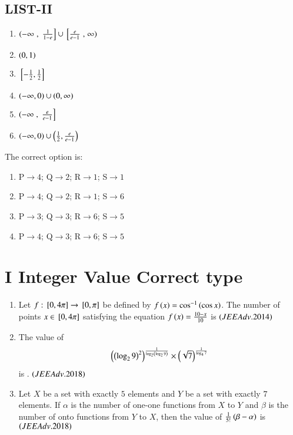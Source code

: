 \documentclass[journal,12pt,onecolumn,article]{IEEEtran}
\theoremstyle{remark}
\begin{document}
\begin{enumerate}
\begin{multicols}{2}
	\section*{LIST-II}
\begin{enumerate}
	\item $\left(-\infty\right.,{}\left.\frac{1}{1-e}\right]\cup{}\left[\frac{e}{e-1}\right.,\left.\infty\right)$
	\item $\left(0,1\right)$
	\item ${}\left[-\frac{1}{2},\frac{1}{2}\right]$
	\item $\left(-\infty,0\right)\cup\left(0,\infty\right)$
	\item $\left(-\infty\right.,{}\left.\frac{e}{e-1}\right]$
	\item $\left(-\infty,0\right)\cup\left(\frac{1}{2},\frac{e}{e-1}\right)$
\end{enumerate}
\end{multicols}
The correct option is:
\begin{multicols}{2}
		\begin{enumerate}
		\item P$\to4$; Q$\to2$; R$\to1$; S$\to1$
		\item P$\to4$; Q$\to2$; R$\to1$; S$\to6$
	\columnbreak
		\item P$\to3$; Q$\to3$; R$\to6$; S$\to5$
		\item P$\to4$; Q$\to3$; R$\to6$; S$\to5$
	\end{enumerate}
\end{multicols}
\end{enumerate}
	    \section*{I Integer Value Correct type}
		   \begin{enumerate}
			   \item Let $f:{}\left[0,4\pi\right]\to{}\left[0,\pi\right]$ be defined by $f\left(x\right)=\cos^{-1}\left(\cos x\right)$. The number of points $x\in{}\left[0,4\pi\right]$ satisfying the equation  ${f\left(x\right)=\frac{10-x}{10}}$ is \hfill{$\left(JEE Adv.2014\right)$}
			   \item The  value  of  
				   \begin{align}
					   \left(\left(\log_29\right)^2\right)^{\frac{1}{\log_2\left(\log_29\right)}}\times \left(\sqrt7\right)^{\frac{1}{\log_47}}
				   \end{align}
				   is .
				   \hfill${\left(JEEAdv.2018\right)}$
			   \item Let $X$ be a set with exactly $5$ elements and $Y$ be a set with exactly $7$ elements. If $\alpha$ is the number of one-one functions from $X$ to $Y$ and $\beta$ is the number of onto functions from $Y$ to $X$, then the value of $\frac{1}{5!}\left(\beta-\alpha\right)$ is \hfill{${\left(JEEAdv.2018\right)}$}
		   \end{enumerate}
\end{document}
